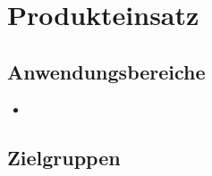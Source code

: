 \chapter{Produkteinsatz}



\section{Anwendungsbereiche}

\begin{itemize}

	\item 
\end{itemize}

\section{Zielgruppen}




